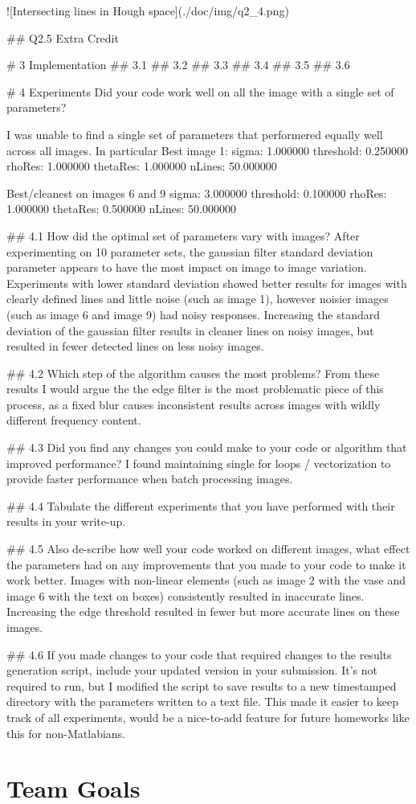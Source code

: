 \documentclass[12pt]{article}
\begin{document}
![Intersecting lines in Hough space](./doc/img/q2_4.png)  


## Q2.5  
Extra Credit

# 3 Implementation
## 3.1
## 3.2
## 3.3
## 3.4
## 3.5
## 3.6

# 4 Experiments
Did your code work well on all the image with a single set of parameters? 

I was unable to find a single set of parameters that performered equally well across all images. In particular
Best image 1:
sigma: 1.000000
threshold: 0.250000
rhoRes: 1.000000
thetaRes: 1.000000
nLines: 50.000000

Best/cleanest on images 6 and 9
sigma: 3.000000
threshold: 0.100000
rhoRes: 1.000000
thetaRes: 0.500000
nLines: 50.000000

## 4.1 How did the optimal set of parameters vary with images? 
After experimenting on 10 parameter sets, the gaussian filter standard deviation parameter appears to have the most impact on image to image variation. Experiments with lower standard deviation showed better results for images with clearly defined lines and little noise (such as image 1), however noisier images (such as image 6 and image 9) had noisy responses.
Increasing the standard deviation of the gaussian filter results in cleaner lines on noisy images, but resulted in fewer detected lines on less noisy images.

## 4.2 Which step of the algorithm causes the most problems? 
From these results I would argue the the edge filter is the most problematic piece of this process, as a fixed blur causes inconsistent results across images with wildly different frequency content.

## 4.3 Did you find any changes you could make to your code or algorithm that improved performance?
I found maintaining single for loops / vectorization to provide faster performance when batch processing images.

## 4.4 Tabulate the different experiments that you have performed with their results in your write-up.

## 4.5 Also de-scribe how well your code worked on different images, what effect the parameters had on any improvements that you made to your code to make it work better. 
Images with non-linear elements (such as image 2 with the vase and image 6 with the text on boxes) consistently resulted in inaccurate lines. Increasing the edge threshold resulted in fewer but more accurate lines on these images.

## 4.6 If you made changes to your code that required changes to the results generation script, include your updated version in your submission.  
It's not required to run, but I modified the script to save results to a new timestamped directory with the parameters written to a text file. This made it easier to keep track of all experiments, would be a nice-to-add feature for future homeworks like this for non-Matlabians.

\newpage


\section{Team Goals}
\end{document}
